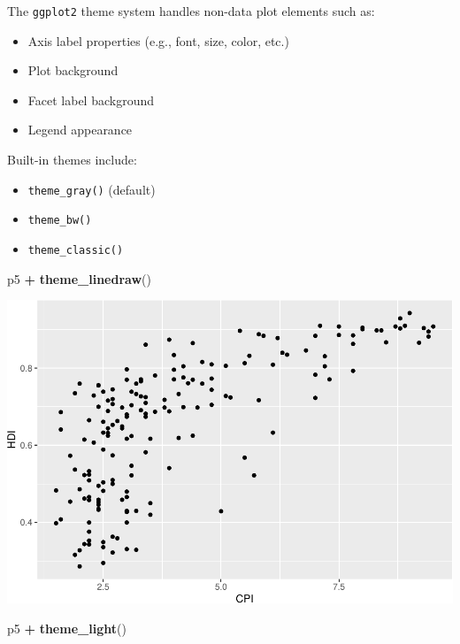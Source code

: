 \documentclass[]{book}
\newenvironment{Shaded}{\begin{snugshade}}{\end{snugshade}}
\newcommand{\KeywordTok}[1]{\textcolor[rgb]{0.13,0.29,0.53}{\textbf{#1}}}
\newcommand{\NormalTok}[1]{#1}
\newcommand{\OperatorTok}[1]{\textcolor[rgb]{0.81,0.36,0.00}{\textbf{#1}}}
\newcommand{\StringTok}[1]{\textcolor[rgb]{0.31,0.60,0.02}{#1}}
\providecommand{\tightlist}{%
  \setlength{\itemsep}{0pt}\setlength{\parskip}{0pt}}
\begin{document}
The \texttt{ggplot2} theme system handles non-data plot elements such as:

\begin{itemize}
\tightlist
\item
  Axis label properties (e.g., font, size, color, etc.)
\item
  Plot background
\item
  Facet label background
\item
  Legend appearance
\end{itemize}

Built-in themes include:

\begin{itemize}
\tightlist
\item
  \texttt{theme\_gray()} (default)
\item
  \texttt{theme\_bw()}
\item
  \texttt{theme\_classic()}
\end{itemize}

\begin{Shaded}
\begin{Highlighting}[]
\NormalTok{p5 }\OperatorTok{+}\StringTok{ }\KeywordTok{theme_linedraw}\NormalTok{()}
\end{Highlighting}
\end{Shaded}

\includegraphics{R/Rgraphics/figures/unnamed-chunk-194-1.pdf}

\begin{Shaded}
\begin{Highlighting}[]
\NormalTok{p5 }\OperatorTok{+}\StringTok{ }\KeywordTok{theme_light}\NormalTok{()}
\end{Highlighting}
\end{Shaded}
\end{document}
